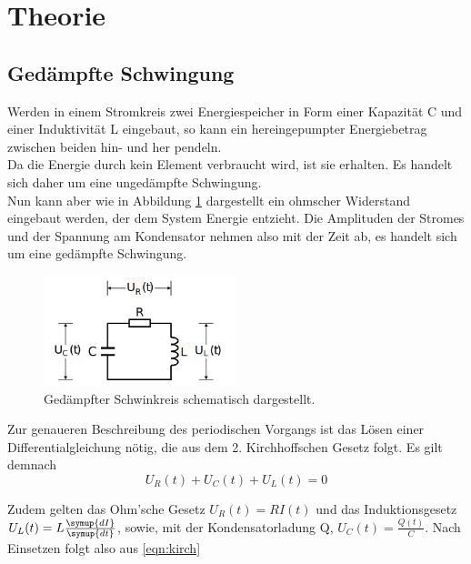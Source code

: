 \section{Theorie}
\label{sec:Theorie}

\subsection{Gedämpfte Schwingung}
    Werden in einem Stromkreis zwei Energiespeicher in Form einer Kapazität C
    und einer Induktivität L eingebaut, so kann ein hereingepumpter Energiebetrag
    zwischen beiden hin- und her pendeln. \\
    Da die Energie durch kein Element verbraucht wird, ist sie erhalten.
    Es handelt sich daher um eine ungedämpfte Schwingung.\\

    \noindent Nun kann aber wie in Abbildung \ref{fig:ung}
    dargestellt ein ohmscher Widerstand eingebaut werden, der dem System 
    Energie entzieht. Die Amplituden der Stromes und der Spannung am Kondensator
    nehmen also mit der Zeit ab, es handelt sich um eine gedämpfte Schwingung.\\

    \begin{figure}
        \centering
        \includegraphics[width=0.5\textwidth]{RLC.png}
        \caption{Gedämpfter Schwinkreis schematisch dargestellt.\cite{anleitung}}
        \label{fig:ung}
    \end{figure}

    \noindent Zur genaueren Beschreibung des periodischen Vorgangs ist 
    das Lösen einer Differentialgleichung nötig, die aus dem 2. Kirchhoffschen 
    Gesetz folgt. Es gilt demnach
    \begin{equation}
        U_R(t) + U_C(t) + U_L(t) = 0
        \label{eqn:kirch}
    \end{equation}
    
    \noindent Zudem gelten das Ohm'sche Gesetz $U_R(t) = R I(t)$ und
    das Induktionsgesetz $U_L(t) = L \frac{\symup{dI}}{\symup{dt}}$, sowie,
    mit der Kondensatorladung Q, $U_C(t) = \frac{Q(t)}{C}$.
    Nach Einsetzen folgt also aus \eqref{eqn:kirch}
    
